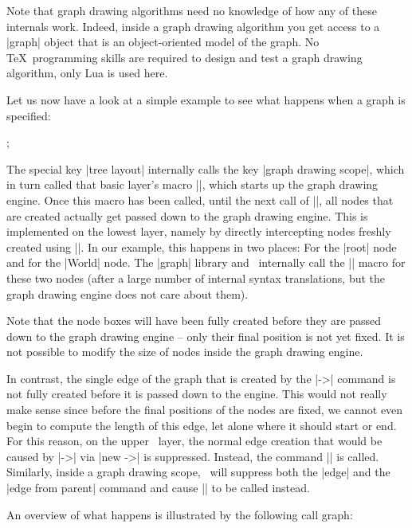 Note that graph drawing algorithms need no knowledge of how any of
these internals work. Indeed, inside a graph drawing algorithm you get
access to a |graph| object that is an object-oriented model of the
graph. No \TeX\ programming skills are required to design and test a
graph drawing algorithm, only Lua is used here.

Let us now have a look at a simple example to see what happens when a
graph is specified:

\begin{codeexample}[]
  ;
\end{codeexample}

The special key |tree layout| internally calls the key
|graph drawing scope|, which in turn called that basic layer's macro
|\pgfgdbeginscope|, which starts up the graph drawing engine. Once this macro has been
called, until the next call of |\pgfgdendscope|, all nodes that are
created actually get passed down to the graph drawing engine. This is
implemented on the lowest layer, namely by directly intercepting
nodes freshly created using |\pgfnode|. In our example, this happens
in two places: For the |root| node and for the |World| node. The
|graph| library and \tikzname\ internally call the |\pgfnode| macro
for these two nodes (after a large number of internal syntax
translations, but the graph drawing engine does not care about them).

Note that the node boxes will have been fully created before they are
passed down to the graph drawing engine -- only their final position
is not yet fixed. It is not possible to modify the size of nodes
inside the graph drawing engine. 

In contrast, the single edge of the graph that is created by the |->|
command is not fully created before it is passed down to the
engine. This would not really make sense since before the final
positions of the nodes are fixed, we cannot even begin to compute the
length of this edge, let alone where it should start or end. For this
reason, on the upper \tikzname\ layer, the normal edge creation that
would be caused by |->| via |new ->| is suppressed. Instead, the
command |\pgfgdedge| is called. Similarly, inside a graph drawing
scope, \tikzname\ will suppress both the |edge| and the
|edge from parent| command and cause |\pgfgdedge| to be called
instead. 

An overview of what happens is illustrated by the following call graph:

